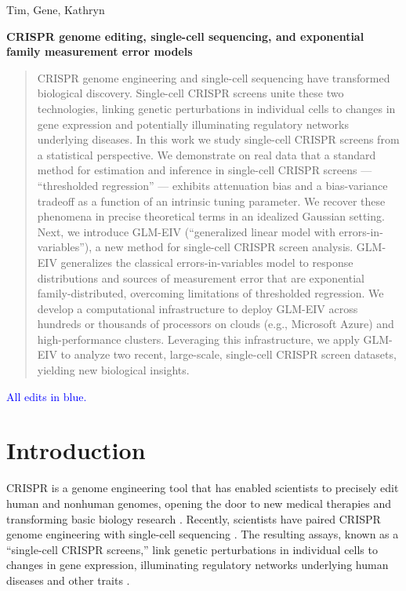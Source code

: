 \documentclass[12pt]{article}
\newcommand{\blue}[1]{\textcolor{blue}{#1}}
\begin{document}
\noindent
Tim, Gene, Kathryn
\begin{center}
\textbf{CRISPR genome editing, single-cell sequencing, and exponential family measurement error models}
\end{center}

\begin{abstract}
CRISPR genome engineering and single-cell sequencing have transformed biological discovery. Single-cell CRISPR screens unite these two technologies, linking genetic perturbations in individual cells to changes in gene expression and potentially illuminating regulatory networks underlying diseases. In this work we study single-cell CRISPR screens from a statistical perspective. We demonstrate on real data that a standard method for estimation and inference in single-cell CRISPR screens — “thresholded regression” — exhibits attenuation bias and a bias-variance tradeoff as a function of an intrinsic tuning parameter. We recover these phenomena in precise theoretical terms in an idealized Gaussian setting. Next, we introduce GLM-EIV (“generalized linear model with errors-in-variables”), a new method for single-cell CRISPR screen analysis. GLM-EIV generalizes the classical errors-in-variables model to response distributions and sources of measurement error that are exponential family-distributed, overcoming limitations of thresholded regression. We develop a computational infrastructure to deploy GLM-EIV across hundreds or thousands of processors on clouds (e.g., Microsoft Azure) and high-performance clusters. Leveraging this infrastructure, we apply GLM-EIV to analyze two recent, large-scale, single-cell CRISPR screen datasets, yielding new biological insights.
\end{abstract}
\tableofcontents
\noindent \blue{All edits in blue.}
\section{Introduction}
CRISPR is a genome engineering tool that has enabled scientists to precisely edit human and nonhuman genomes, opening the door to new medical therapies \cite{Rothgangl2021,Musunuru2021} and transforming basic biology research \cite{Przybyla2021}. Recently, scientists have paired CRISPR genome engineering with single-cell sequencing \cite{Dixit2016,Datlinger2017}. The resulting assays, known as a ``single-cell CRISPR screens,'' link genetic perturbations in individual cells to changes in gene expression, illuminating regulatory networks underlying human diseases and other traits \cite{Morris2021a}.
\end{document}
